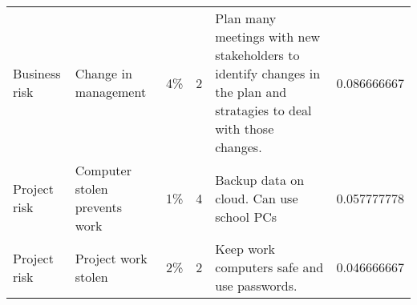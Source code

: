 \documentclass{article}
\begin{document}
\begin{table}[]
\begin{tabular}{llllll}
    Business risk  & Change in management                                  & 4\%         & 2      & Plan many meetings with new stakeholders to identify changes in the plan and stratagies to deal with those changes.                                                              & 0.086666667   \\
    Project risk   & Computer stolen prevents work                         & 1\%         & 4      & Backup data on cloud. Can use school PCs                                                                                                                                         & 0.057777778   \\
    Project risk   & Project work stolen                                   & 2\%         & 2      & Keep work computers safe and use passwords.                                                                                                                                      & 0.046666667   \\ \hline
    \end{tabular}
    \end{table}
\end{document}
